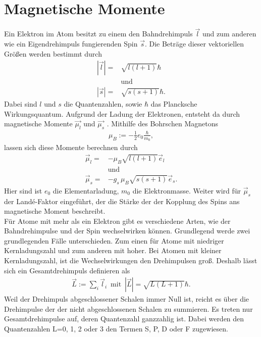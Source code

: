 

\section{Magnetische Momente}
Ein Elektron im Atom besitzt zu einem den Bahndrehimpuls $\vec{l}$ und zum anderen wie ein Eigendrehimpuls fungierenden Spin $\vec{s}$.
Die Beträge dieser vektoriellen Größen werden bestimmt durch
\begin{align}
	|\vec{l}|=&\sqrt{l(l+1)}\hbar\\
	\nonumber &\text{und}\\
	|\vec{s}|=&\sqrt{s(s+1)}\hbar.
\end{align}
Dabei sind $l$ und $s$ die Quantenzahlen, sowie $\hbar$ das Plancksche Wirkungsquantum.
Aufgrund der Ladung der Elektronen, entsteht da durch magnetische Momente $\vec{\mu_l}$ und $\vec{\mu_s}$ .
Mithilfe des Bohrschen Magnetons 
\begin{align}
	\mu_B:=-\frac{1}{2}e_0 \frac{\hbar}{m_0},
\end{align}
lassen sich diese Momente berechnen durch
\begin{align}
	\vec{\mu}_l=&-\mu_B\sqrt{l(l+1)}\vec{e}_l\\
	\nonumber &\text{und}\\
	\vec{\mu}_s=&-g_s\,\mu_B\sqrt{s(s+1)}\vec{e}_s.
\end{align}
Hier sind ist $e_0$ die Elementarladung, $m_0$ die Elektronmasse.
Weiter wird für $\vec{\mu}_s$ der Landé-Faktor eingeführt, der die Stärke der der Kopplung des Spins ans magnetische Moment beschreibt.\\
\noindent
Für Atome mit mehr als ein Elektron gibt es verschiedene Arten, wie der Bahndrehimpulse und der Spin wechselwirken können.
Grundlegend werde zwei grundlegenden Fälle unterschieden.
Zum einen für Atome mit niedriger Kernladungszahl und zum anderen mit hoher.
Bei Atomen mit kleiner Kernladungszahl, ist die Wechselwirkungen den Drehimpulsen groß.
Deshalb lässt sich ein Gesamtdrehimpuls definieren als
\begin{align}
	\vec{L}:=\sum_i \vec{l}_i\, \text{ mit }\, |\vec{L}|=\sqrt{L(L+1)}\hbar.
\end{align}
Weil der Drehimpuls abgeschlossener Schalen immer Null ist, reicht es über die Drehimpulse der der nicht abgeschlossenen Schalen zu summieren.
Es treten nur Gesamtdrehimpulse auf, deren Quantenzahl ganzzahlig ist.
Dabei werden den Quantenzahlen L=0, 1, 2 oder 3 den Termen S, P, D oder F zugewiesen.\\
